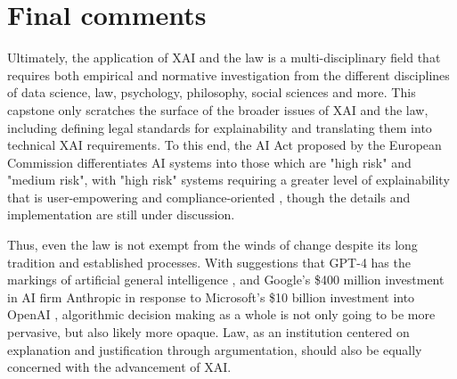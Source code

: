 \section{Final comments}
Ultimately, the application of XAI and the law is a multi-disciplinary field that requires both empirical and normative investigation from the different disciplines of data science, law, psychology, philosophy, social sciences and more. This capstone only scratches the surface of the broader issues of XAI and the law, including defining legal standards for explainability and translating them into technical XAI requirements. To this end, the AI Act proposed by the European Commission differentiates AI systems into those which are "high risk" and "medium risk", with "high risk" systems requiring a greater level of explainability that is user-empowering and compliance-oriented \cite{sovrano2022metrics}, though the details and implementation are still under discussion.

Thus, even the law is not exempt from the winds of change despite its long tradition and established processes. With suggestions that GPT-4 has the markings of artificial general intelligence \cite{bubeck2023sparks}, and Google's \$400 million investment in AI firm Anthropic in response to Microsoft's \$10 billion investment into OpenAI \cite{bloomberg_google}, algorithmic decision making as a whole is not only going to be more pervasive, but also likely more opaque. Law, as an institution centered on explanation and justification through argumentation, should also be equally concerned with the advancement of XAI.
